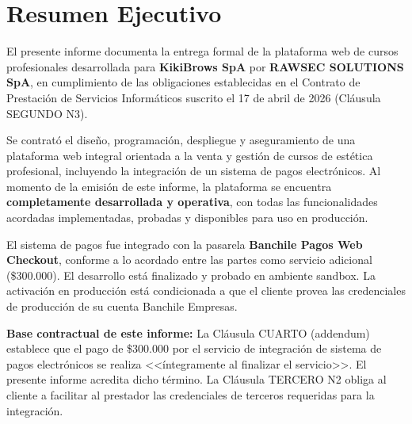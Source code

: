 \documentclass[a4paper,11pt]{article}
\begin{document}
\newpage

\tableofcontents
\newpage

\section{Resumen Ejecutivo}

El presente informe documenta la entrega formal de la plataforma web de cursos profesionales
desarrollada para \textbf{KikiBrows SpA} por \textbf{RAWSEC SOLUTIONS SpA}, en cumplimiento
de las obligaciones establecidas en el Contrato de Prestaci\'on de Servicios Inform\'aticos
suscrito el 17 de abril de 2026 (Cl\'ausula SEGUNDO N\textdegree{}3).

Se contrató el dise\~no, programaci\'on, despliegue y aseguramiento de una plataforma web
integral orientada a la venta y gesti\'on de cursos de est\'etica profesional, incluyendo la
integraci\'on de un sistema de pagos electr\'onicos. Al momento de la emisi\'on de este
informe, la plataforma se encuentra \textbf{completamente desarrollada y operativa}, con todas
las funcionalidades acordadas implementadas, probadas y disponibles para uso en producci\'on.

El sistema de pagos fue integrado con la pasarela \textbf{Banchile Pagos Web Checkout},
conforme a lo acordado entre las partes como servicio adicional (\$300.000). El desarrollo
est\'a finalizado y probado en ambiente sandbox. La activaci\'on en producci\'on est\'a
condicionada a que el cliente provea las credenciales de producci\'on de su cuenta Banchile
Empresas.

\begin{infobox}
\textbf{Base contractual de este informe:} La Cl\'ausula CUARTO (addendum) establece que el
pago de \$300.000 por el servicio de integraci\'on de sistema de pagos electr\'onicos se
realiza <<\'integramente al finalizar el servicio>>. El presente informe acredita dicho
t\'ermino. La Cl\'ausula TERCERO N\textdegree{}2 obliga al cliente a facilitar al prestador
las credenciales de terceros requeridas para la integraci\'on.
\end{infobox}


\end{document}

